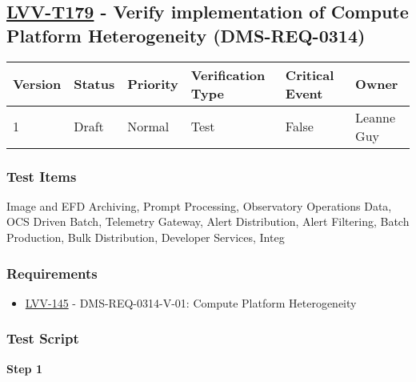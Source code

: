 \hypertarget{lvv-t179---verify-implementation-of-compute-platform-heterogeneity-dms-req-0314}{%
\subsection{\texorpdfstring{\href{https://jira.lsstcorp.org/secure/Tests.jspa\#/testCase/LVV-T179}{LVV-T179}
- Verify implementation of Compute Platform Heterogeneity
(DMS-REQ-0314)}{LVV-T179 - Verify implementation of Compute Platform Heterogeneity (DMS-REQ-0314)}}\label{lvv-t179---verify-implementation-of-compute-platform-heterogeneity-dms-req-0314}}

\begin{longtable}[]{@{}llllll@{}}
\toprule
Version & Status & Priority & Verification Type & Critical Event &
Owner\tabularnewline
\midrule
\endhead
1 & Draft & Normal & Test & False & Leanne Guy\tabularnewline
\bottomrule
\end{longtable}

\hypertarget{test-items-79}{%
\subsubsection{Test Items}\label{test-items-79}}

Image and EFD Archiving, Prompt Processing, Observatory Operations Data,
OCS Driven Batch, Telemetry Gateway, Alert Distribution, Alert
Filtering, Batch Production, Bulk Distribution, Developer Services,
Integ

\hypertarget{requirements-79}{%
\subsubsection{Requirements}\label{requirements-79}}

\begin{itemize}
\tightlist
\item
  \href{https://jira.lsstcorp.org/browse/LVV-145}{LVV-145} -
  DMS-REQ-0314-V-01: Compute Platform Heterogeneity
\end{itemize}

\hypertarget{test-script-79}{%
\subsubsection{Test Script}\label{test-script-79}}

\textbf{Step 1}\\
~\\
~\\

